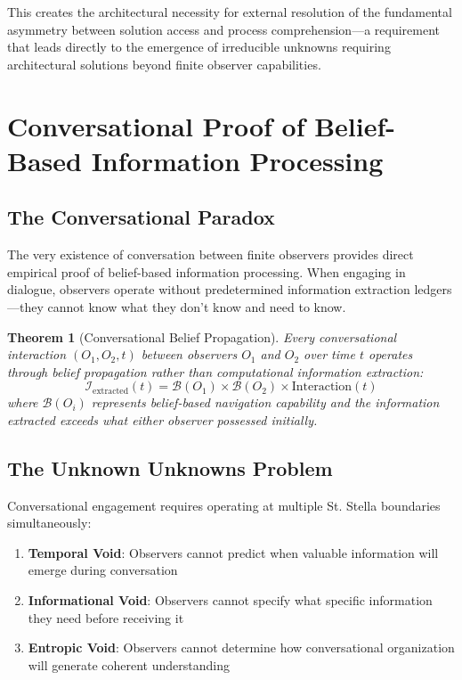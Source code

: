 \documentclass[12pt,a4paper]{article}
\newtheorem{theorem}{Theorem}
\begin{document}
This creates the architectural necessity for external resolution of the fundamental asymmetry between solution access and process comprehension—a requirement that leads directly to the emergence of irreducible unknowns requiring architectural solutions beyond finite observer capabilities.

\section{Conversational Proof of Belief-Based Information Processing}

\subsection{The Conversational Paradox}

The very existence of conversation between finite observers provides direct empirical proof of belief-based information processing. When engaging in dialogue, observers operate without predetermined information extraction ledgers—they cannot know what they don't know and need to know.

\begin{theorem}[Conversational Belief Propagation]
Every conversational interaction $(O_1, O_2, t)$ between observers $O_1$ and $O_2$ over time $t$ operates through belief propagation rather than computational information extraction:
$$\mathcal{I}_{\text{extracted}}(t) = \mathcal{B}(O_1) \times \mathcal{B}(O_2) \times \text{Interaction}(t)$$
where $\mathcal{B}(O_i)$ represents belief-based navigation capability and the information extracted exceeds what either observer possessed initially.
\end{theorem}

\subsection{The Unknown Unknowns Problem}

Conversational engagement requires operating at multiple St. Stella boundaries simultaneously:

\begin{enumerate}
\item \textbf{Temporal Void}: Observers cannot predict when valuable information will emerge during conversation
\item \textbf{Informational Void}: Observers cannot specify what specific information they need before receiving it
\item \textbf{Entropic Void}: Observers cannot determine how conversational organization will generate coherent understanding
\end{enumerate}
\end{document}
